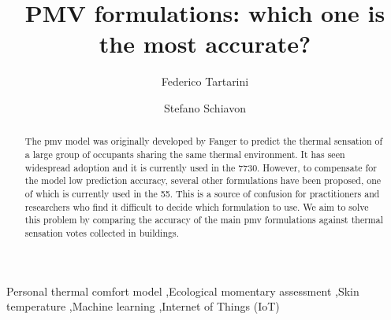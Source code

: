 
\begin{frontmatter}

    \title{PMV formulations: which one is the most accurate?}

    \author[label1]{Federico Tartarini}
    \author[label2]{Stefano Schiavon}

    \address[label1]{Berkeley Education Alliance for Research in Singapore, Singapore}
    \address[label2]{Center for the Built Environment, University of California, Berkeley, CA, USA}


    \begin{abstract}
        The \ac{pmv} model was originally developed by Fanger to predict the thermal sensation of a large group of occupants sharing the same thermal environment.
        It has seen widespread adoption and it is currently used in the \gls{7730}.
        However, to compensate for the model low prediction accuracy, several other formulations have been proposed, one of which is currently used in the \gls{55}.
        This is a source of confusion for practitioners and researchers who find it difficult to decide which formulation to use.
        We aim to solve this problem by comparing the accuracy of the main \ac{pmv} formulations against  thermal sensation votes collected in buildings.
    \end{abstract}

    \begin{keyword}
        Personal thermal comfort model \sep Ecological momentary assessment \sep Skin temperature \sep Machine learning \sep Internet of Things (IoT)
    \end{keyword}

\end{frontmatter}
